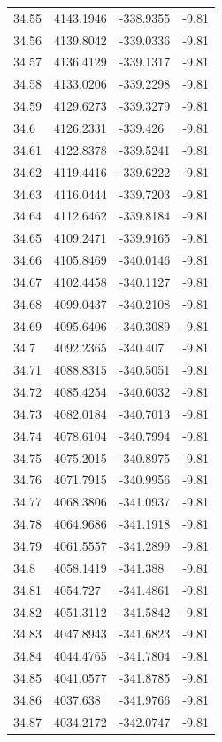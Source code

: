 \begin{table}[H]
\begin{tabular}{llll}
34.55 & 4143.1946 & -338.9355 & -9.81 \\
34.56 & 4139.8042 & -339.0336 & -9.81 \\
34.57 & 4136.4129 & -339.1317 & -9.81 \\
34.58 & 4133.0206 & -339.2298 & -9.81 \\
34.59 & 4129.6273 & -339.3279 & -9.81 \\
34.6 & 4126.2331 & -339.426 & -9.81 \\
34.61 & 4122.8378 & -339.5241 & -9.81 \\
34.62 & 4119.4416 & -339.6222 & -9.81 \\
34.63 & 4116.0444 & -339.7203 & -9.81 \\
34.64 & 4112.6462 & -339.8184 & -9.81 \\
34.65 & 4109.2471 & -339.9165 & -9.81 \\
34.66 & 4105.8469 & -340.0146 & -9.81 \\
34.67 & 4102.4458 & -340.1127 & -9.81 \\
34.68 & 4099.0437 & -340.2108 & -9.81 \\
34.69 & 4095.6406 & -340.3089 & -9.81 \\
34.7 & 4092.2365 & -340.407 & -9.81 \\
34.71 & 4088.8315 & -340.5051 & -9.81 \\
34.72 & 4085.4254 & -340.6032 & -9.81 \\
34.73 & 4082.0184 & -340.7013 & -9.81 \\
34.74 & 4078.6104 & -340.7994 & -9.81 \\
34.75 & 4075.2015 & -340.8975 & -9.81 \\
34.76 & 4071.7915 & -340.9956 & -9.81 \\
34.77 & 4068.3806 & -341.0937 & -9.81 \\
34.78 & 4064.9686 & -341.1918 & -9.81 \\
34.79 & 4061.5557 & -341.2899 & -9.81 \\
34.8 & 4058.1419 & -341.388 & -9.81 \\
34.81 & 4054.727 & -341.4861 & -9.81 \\
34.82 & 4051.3112 & -341.5842 & -9.81 \\
34.83 & 4047.8943 & -341.6823 & -9.81 \\
34.84 & 4044.4765 & -341.7804 & -9.81 \\
34.85 & 4041.0577 & -341.8785 & -9.81 \\
34.86 & 4037.638 & -341.9766 & -9.81 \\
34.87 & 4034.2172 & -342.0747 & -9.81 \\

\end{tabular}
\end{table}
